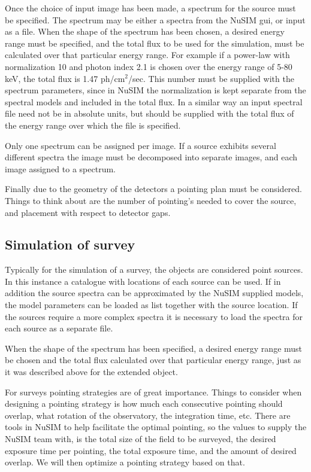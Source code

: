 Once the choice of input image has been made, a spectrum for the source must be specified. The spectrum may be either a spectra from the NuSIM gui, or input as a file. When the shape of the spectrum has been chosen, a desired energy range must be specified, and the total flux to be used for the simulation, must be calculated over that particular energy range. For example if a power-law with normalization 10 and photon index 2.1 is chosen over the energy range of 5-80 keV, the total flux is 1.47 ph/cm$^2$/sec. This number must be supplied with the spectrum parameters, since in NuSIM the normalization is kept separate from the spectral models and included in the total flux. In a similar way an input spectral file need not be in absolute units, but should be supplied with the total flux of the energy range over which the file is specified.

Only one spectrum can be assigned per image. If a source exhibits several different spectra the image must be decomposed into separate images, and each image assigned to a spectrum.

Finally due to the geometry of the detectors a pointing plan must be considered. Things to think about are the number of pointing's needed to cover the source, and placement with respect to detector gaps.

\subsection{Simulation of survey}
Typically for the simulation of a survey, the objects are considered point sources. In this instance a catalogue with locations of each source can be used. If in addition the source spectra can be approximated by the NuSIM supplied models, the model parameters can be loaded as list together with the source location. If the sources require a more complex spectra it is necessary to load the spectra for each source as a separate file.

When the shape of the spectrum has been specified, a desired energy range must be chosen and the total flux calculated over that particular energy range, just as it was described above for the extended object.

For surveys pointing strategies are of great importance. Things to consider when designing a pointing strategy is how much each consecutive pointing should overlap, what rotation of the observatory, the integration time, etc. There are tools in NuSIM to help facilitate the optimal pointing, so the values to supply the NuSIM team with, is the total size of the field to be surveyed, the desired exposure time per pointing, the total exposure time, and the amount of desired overlap. We will then optimize a pointing strategy based on that.

%
